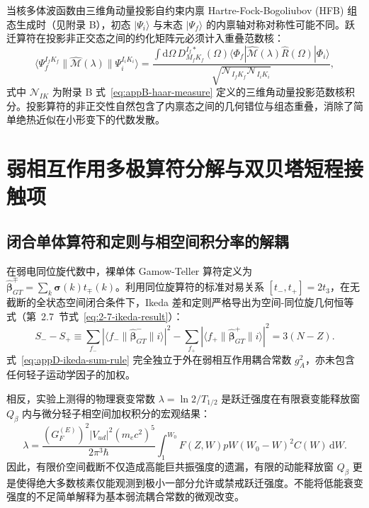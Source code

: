 当核多体波函数由三维角动量投影自约束内禀 Hartre-Fock-Bogoliubov (HFB) 组态生成时（见附录 B），初态 $|\Psi_i\rangle$ 与末态 $|\Psi_f\rangle$ 的内禀轴对称对称性可能不同。跃迁算符在投影非正交态之间的约化矩阵元必须计入重叠范数核：
\begin{equation}\label{eq:appD-projected-nme}
\langle \Psi_f^{I_f K_f} \| \hat{\mathcal{M}}(\lambda) \| \Psi_i^{I_i K_i} \rangle = \frac{\int \mathrm{d}\Omega \, D^{I_f *}_{M_f K_f}(\Omega) \langle \Phi_f | \hat{\mathcal{M}}(\lambda) \hat{R}(\Omega) | \Phi_i \rangle}{\sqrt{\mathcal{N}_{I_f K_f} \mathcal{N}_{I_i K_i}}},
\end{equation}
式中 $\mathcal{N}_{IK}$ 为附录 B 式~\eqref{eq:appB-haar-measure} 定义的三维角动量投影范数核积分。投影算符的非正交性自然包含了内禀态之间的几何错位与组态重叠，消除了简单绝热近似在小形变下的代数发散。

\section{弱相互作用多极算符分解与双贝塔短程接触项}\label{sec:appD-weak-operators}

\subsection{闭合单体算符和定则与相空间积分率的解耦}

在弱电同位旋代数中，裸单体 Gamow-Teller 算符定义为 $\hat{\boldsymbol{\beta}}^\mp_{GT} = \sum_k \boldsymbol{\sigma}(k) t_\mp(k)$。利用同位旋算符的标准对易关系 $[t_-, t_+] = 2 t_3$，在无截断的全状态空间闭合条件下，Ikeda 差和定则严格导出为空间-同位旋几何恒等式（第~2.7~节式~\eqref{eq:2-7-ikeda-result}）：
\begin{equation}\label{eq:appD-ikeda-sum-rule}
S_- - S_+ \equiv \sum_{f_-} |\langle f_- \| \hat{\boldsymbol{\beta}}^-_{GT} \| i \rangle|^2 - \sum_{f_+} |\langle f_+ \| \hat{\boldsymbol{\beta}}^+_{GT} \| i \rangle|^2 = 3(N - Z).
\end{equation}
式~\eqref{eq:appD-ikeda-sum-rule} 完全独立于外在弱相互作用耦合常数 $g_A^2$，亦未包含任何轻子运动学因子的加权。

相反，实验上测得的物理衰变常数 $\lambda = \ln 2 / T_{1/2}$ 是跃迁强度在有限衰变能释放窗 $Q_\beta$ 内与微分轻子相空间加权积分的宏观结果：
\begin{equation}\label{eq:appD-lambda-phase-space}
\lambda = \frac{(G_F^{(E)})^2 |V_{ud}|^2 (m_e c^2)^5}{2\pi^3 \hbar} \int_1^{W_0} F(Z, W) p W (W_0 - W)^2 C(W) \, \mathrm{d}W.
\end{equation}
因此，有限价空间截断不仅造成高能巨共振强度的遗漏，有限的动能释放窗 $Q_\beta$ 更是使得绝大多数核素仅能观测到极小一部分允许或禁戒跃迁强度。不能将低能衰变强度的不足简单解释为基本弱流耦合常数的微观改变。

